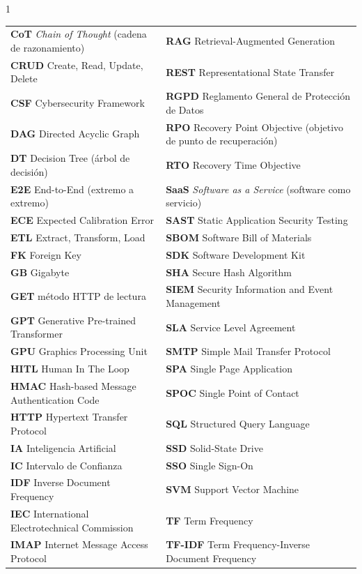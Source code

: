 \begin{spacing}{1}
\begin{tabular}{@{}>{\raggedright\arraybackslash}p{}@{\hspace{0.05\textwidth}}>{\raggedright\arraybackslash}p{}@{}}
\textbf{CoT} \emph{Chain of Thought} (cadena de razonamiento) & \textbf{RAG} Retrieval-Augmented Generation \\
\textbf{CRUD} Create, Read, Update, Delete & \textbf{REST} Representational State Transfer \\
\textbf{CSF} Cybersecurity Framework & \textbf{RGPD} Reglamento General de Protección de Datos \\
\textbf{DAG} Directed Acyclic Graph & \textbf{RPO} Recovery Point Objective (objetivo de punto de recuperación) \\
\textbf{DT} Decision Tree (árbol de decisión) & \textbf{RTO} Recovery Time Objective \\
\textbf{E2E} End-to-End (extremo a extremo) & \textbf{SaaS} \emph{Software as a Service} (software como servicio) \\
\textbf{ECE} Expected Calibration Error & \textbf{SAST} Static Application Security Testing \\
\textbf{ETL} Extract, Transform, Load & \textbf{SBOM} Software Bill of Materials \\
\textbf{FK} Foreign Key & \textbf{SDK} Software Development Kit \\
\textbf{GB} Gigabyte & \textbf{SHA} Secure Hash Algorithm \\
\textbf{GET} método HTTP de lectura & \textbf{SIEM} Security Information and Event Management \\
\textbf{GPT} Generative Pre-trained Transformer & \textbf{SLA} Service Level Agreement \\
\textbf{GPU} Graphics Processing Unit & \textbf{SMTP} Simple Mail Transfer Protocol \\
\textbf{HITL} Human In The Loop & \textbf{SPA} Single Page Application \\
\textbf{HMAC} Hash-based Message Authentication Code & \textbf{SPOC} Single Point of Contact \\
\textbf{HTTP} Hypertext Transfer Protocol & \textbf{SQL} Structured Query Language \\
\textbf{IA} Inteligencia Artificial & \textbf{SSD} Solid-State Drive \\
\textbf{IC} Intervalo de Confianza & \textbf{SSO} Single Sign-On \\
\textbf{IDF} Inverse Document Frequency & \textbf{SVM} Support Vector Machine \\
\textbf{IEC} International Electrotechnical Commission & \textbf{TF} Term Frequency \\
\textbf{IMAP} Internet Message Access Protocol & \textbf{TF-IDF} Term Frequency-Inverse Document Frequency \\

\end{tabular}
\end{spacing}
